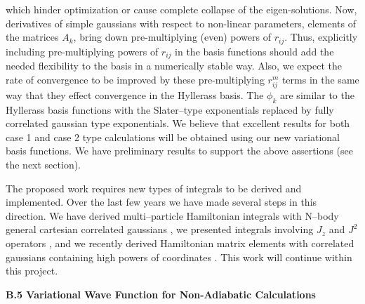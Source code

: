 {{which hinder optimization or cause complete collapse of the eigen-solutions.
Now, derivatives of simple gaussians with respect to non-linear parameters,
elements of the matrices $A_k$, bring down pre-multiplying (even) powers of $%
r_{ij}$. Thus, explicitly including pre-multiplying powers of $r_{ij}$ in
the basis functions should add the needed flexibility to the basis in a
numerically stable way. Also, we expect the rate of convergence to be
improved by these pre-multiplying $r_{ij}^m$ terms in the same way that they
effect convergence in the Hyllerass basis. The $\phi _k$ are similar to the
Hyllerass basis functions with the Slater--type exponentials replaced by
fully correlated gaussian type exponentials. We believe that excellent
results for both case 1 and case 2 type calculations will be obtained using
our new variational basis functions. We have preliminary results to support
the above assertions (see the next section).

The proposed work requires new types of integrals to be derived
and implemented. Over the last few years we have made several
steps in this direction. We have derived multi--particle
Hamiltonian integrals with N--body 
general cartesian correlated gaussians
\cite{kozlowski92a}, we presented integrals involving
$J_z$ and $J^2$ operators \cite{A20}, and we recently derived
Hamiltonian matrix elements with correlated gaussians
containing high powers of coordinates  \cite{A382}.
This work will continue within this project.

\vspace{2mm}
\noindent
{\bf B.5 Variational Wave Function for Non-Adiabatic Calculations}

}}
